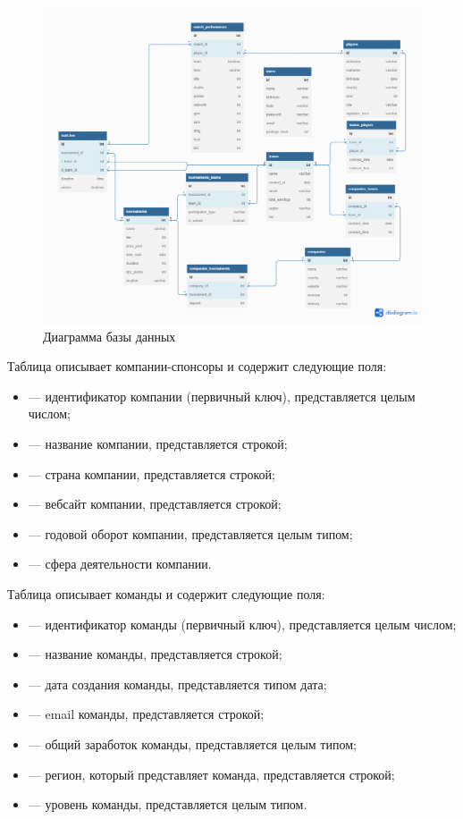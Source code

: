 \begin{figure}[h!btp]
	\centering \includegraphics[width=\textwidth, page=2]{inc/img/database.png}
	\caption{Диаграмма базы данных}
	\label{fig:database}	
\end{figure}

Таблица  описывает компании-спонсоры и содержит следующие поля:
\begin{itemize}
	\item {} --- идентификатор компании (первичный ключ), представляется целым числом;
	\item {} --- название компании, представляется строкой;
	\item {} --- страна компании, представляется строкой;
	\item {} --- вебсайт компании, представляется строкой;
	\item {} --- годовой оборот компании, представляется целым типом;
	\item {} --- сфера деятельности компании. 
\end{itemize}

\newpage

Таблица  описывает команды и содержит следующие поля:
\begin{itemize}
	\item {} --- идентификатор команды (первичный ключ), представляется целым числом;
	\item {} --- название команды, представляется строкой;
	\item {} --- дата создания команды, представляется типом дата;
	\item {} --- email команды, представляется строкой;
	\item {} --- общий заработок команды, представляется целым типом;
	\item {} --- регион, который представляет команда, представляется строкой;
	\item {} --- уровень команды, представляется целым типом. 
\end{itemize}

